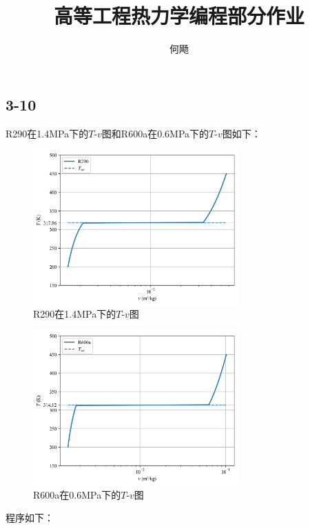 \documentclass[12pt,a4paper]{article}
\title{高等工程热力学编程部分作业}
\author{何飏 \quad 3123101186}
\date{}
\begin{document}
\maketitle

\subsection*{3-10}

R290在1.4MPa下的$T$-$v$图和R600a在0.6MPa下的$T$-$v$图如下：
\begin{figure}[H]
    \centering
    \includegraphics[width=0.7\textwidth]{../chp3/figs/R290.png}
    \caption{R290在1.4MPa下的$T$-$v$图}
\end{figure}

\begin{figure}[H]
    \centering
    \includegraphics[width=0.7\textwidth]{../chp3/figs/R600a.png}
    \caption{R600a在0.6MPa下的$T$-$v$图}
\end{figure}

程序如下：
\end{document}
